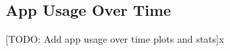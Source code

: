 \documentclass{article}
\begin{document}

% 
% 

\subsection*{App Usage Over Time}

[TODO: Add app usage over time plots and stats]x
\end{document}
